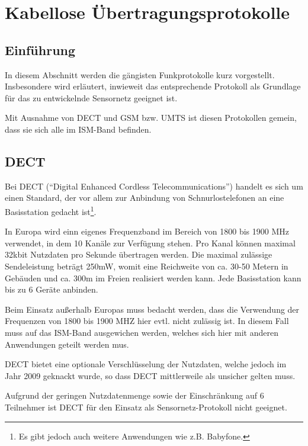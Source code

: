 \section{Kabellose Übertragungsprotokolle}
    \subsection{Einführung}
        In diesem Abschnitt werden die gängisten Funkprotokolle kurz vorgestellt. Insbesondere wird erläutert,
        inwieweit das entsprechende Protokoll als Grundlage für das zu entwickelnde Sensornetz geeignet ist.

        Mit Ausnahme von DECT und GSM bzw. UMTS ist diesen Protokollen gemein, dass sie sich alle im ISM-Band 
        befinden. 

    \subsection{DECT}
        Bei DECT ("`Digital Enhanced Cordless Telecommunications"') handelt es sich um einen Standard, 
        der vor allem zur Anbindung von Schnurlostelefonen an eine Basisstation gedacht ist\footnote{Es gibt
        jedoch auch weitere Anwendungen wie z.B. Babyfone.}. 

        In Europa wird einn eigenes Frequenzband im Bereich von 1800 bis 1900 MHz verwendet, in dem 10 
        Kanäle zur Verfügung stehen. Pro Kanal können maximal 32kbit Nutzdaten pro Sekunde übertragen
        werden. Die maximal zulässige Sendeleistung beträgt 250mW, womit eine Reichweite von ca. 30-50
        Metern in Gebäuden und ca. 300m im Freien realisiert werden kann. Jede Basisstation kann
        bis zu 6 Geräte anbinden.

        Beim Einsatz außerhalb Europas muss bedacht werden, dass die Verwendung der Frequenzen von
        1800 bis 1900 MHZ hier evtl. nicht zulässig ist. In diesem Fall muss auf das ISM-Band 
        ausgewichen werden, welches sich hier mit anderen Anwendungen geteilt werden mus.

        DECT bietet eine optionale Verschlüsselung der Nutzdaten, welche jedoch im Jahr 2009 geknackt
        wurde, so dass DECT mittlerweile als unsicher gelten muss.

        Aufgrund der geringen Nutzdatenmenge sowie der Einschränkung auf 6 Teilnehmer ist
        DECT für den Einsatz als Sensornetz-Protokoll nicht geeignet.

